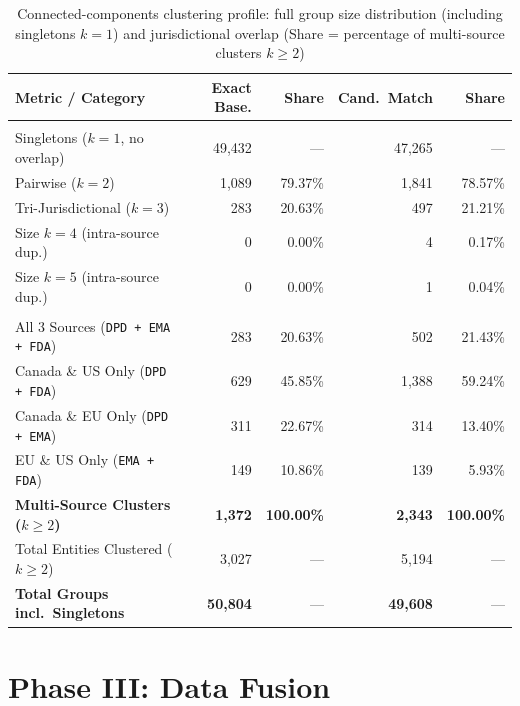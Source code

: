 \documentclass{llncs}
\begin{document}
\begin{table}[htbp]
\centering
\caption{Connected-components clustering profile: full group size distribution (including singletons $k=1$) and jurisdictional overlap (Share = percentage of multi-source clusters $k \ge 2$)}
\label{tab:clustering_profile}
\scriptsize
\setlength{\tabcolsep}{3pt}
\begin{tabularx}{\textwidth}{|>{\raggedright\arraybackslash}X|r|r|r|r|}
\hline
\textbf{Metric / Category} & \textbf{Exact Base.} & \textbf{Share} & \textbf{Cand.\ Match} & \textbf{Share} \\
\hline
\multicolumn{5}{|l|}{\textit{\textbf{Group Size Distribution ($k$)}}} \\
\hline
Singletons ($k = 1$, no overlap)  & 49,432 & ---     & 47,265 & --- \\
Pairwise ($k = 2$)               &  1,089 & 79.37\% &  1,841 & 78.57\% \\
Tri-Jurisdictional ($k = 3$)     &    283 & 20.63\% &    497 & 21.21\% \\
Size $k = 4$ (intra-source dup.) &      0 &  0.00\% &      4 &  0.17\% \\
Size $k = 5$ (intra-source dup.) &      0 &  0.00\% &      1 &  0.04\% \\
\hline
\multicolumn{5}{|l|}{\textit{\textbf{Jurisdictional Overlap Breakdown ($k \ge 2$)}}} \\
\hline
All 3 Sources (\texttt{DPD + EMA + FDA}) & 283 & 20.63\% &   502 & 21.43\% \\
Canada \& US Only (\texttt{DPD + FDA})   & 629 & 45.85\% & 1,388 & 59.24\% \\
Canada \& EU Only (\texttt{DPD + EMA})   & 311 & 22.67\% &   314 & 13.40\% \\
EU \& US Only (\texttt{EMA + FDA})       & 149 & 10.86\% &   139 &  5.93\% \\
\hline
\textbf{Multi-Source Clusters ($k \ge 2$)} & \textbf{1,372} & \textbf{100.00\%} & \textbf{2,343} & \textbf{100.00\%} \\
Total Entities Clustered ($k \ge 2$)       & 3,027 & --- & 5,194 & --- \\
\textbf{Total Groups incl.\ Singletons}    & \textbf{50,804} & --- & \textbf{49,608} & --- \\
\hline
\end{tabularx}
\end{table}

\section{Phase III: Data Fusion}
\label{sec:data_fusion}
\end{document}
